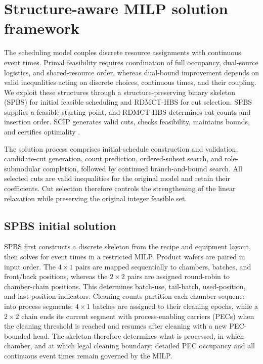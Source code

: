\documentclass[journal]{IEEEtran}
\newcommand{\method}{RDMCT-HBS}
\begin{document}
\section{Structure-aware MILP solution framework}

\label{sec:method-new}

The scheduling model couples discrete resource assignments with continuous event times. Primal feasibility requires coordination of full occupancy, dual-source logistics, and shared-resource order, whereas dual-bound improvement depends on valid inequalities acting on discrete choices, continuous times, and their coupling. We exploit these structures through a structure-preserving binary skeleton (SPBS) for initial feasible scheduling and \method{} for cut selection. SPBS supplies a feasible starting point, and \method{} determines cut counts and insertion order. SCIP generates valid cuts, checks feasibility, maintains bounds, and certifies optimality \cite{achterberg2009scip,bestuzheva2023scip}.

The solution process comprises initial-schedule construction and validation, candidate-cut generation, count prediction, ordered-subset search, and role-submodular completion, followed by continued branch-and-bound search. All selected cuts are valid inequalities for the original model and retain their coefficients. Cut selection therefore controls the strengthening of the linear relaxation while preserving the original integer feasible set.

\subsection{SPBS initial solution}

SPBS first constructs a discrete skeleton from the recipe and equipment layout, then solves for event times in a restricted MILP. Product wafers are paired in input order. The $4\times1$ pairs are mapped sequentially to chambers, batches, and front/back positions, whereas the $2\times2$ pairs are assigned round-robin to chamber-chain positions. This determines batch-use, tail-batch, used-position, and last-position indicators. Cleaning counts partition each chamber sequence into process segments: $4\times1$ batches are assigned to their cleaning epochs, while a $2\times2$ chain ends its current segment with process-enabling carriers (PECs) when the cleaning threshold is reached and resumes after cleaning with a new PEC-bounded head. The skeleton therefore determines what is processed, in which chamber, and at which legal cleaning boundary; detailed PEC occupancy and all continuous event times remain governed by the MILP.
\end{document}

